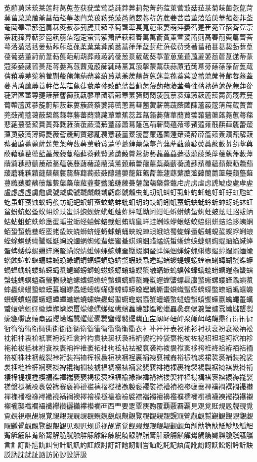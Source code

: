 莬莭莮莯莰莱莲莳莴莵莶获莸莹莺莻莼莽莾莿菀菁菂菃菄菅菆菇菈菉菊菋菌菍菎菏菐菑菒菓菔菕菖菗菘菙菚菛菜菝菞菟菠菡菢菣菤菥菦菧菨菩菪菫菬菭菮華菰菱菲菳菴菵菶菷菸菹菺菻菼菽菾菿萀萁萂萃萄萅萆萇萈萉萊萋萌萍萎萏萐萑萒萓萔萕萖萗萘萙萚萛萜萝萞萟萠萡萢萣萤营萦萧萨萩萪萫萬萭萮萯萰萱萲萳萴萵萶萷萸萹萺萻萼落萾萿葀葁葂葃葄葅葆葇葈葉葊葋葌葍葎葏葐葑葒葓葔葕葖著葘葙葚葛葜葝葞葟葠葡葢董葤葥葦葧葨葩葪葫葬葭葮葯葰葱葲葳葴葵葶葷葸葹葺葻葼葽葾葿蒀蒁蒂蒃蒄蒅蒆蒇蒈蒉蒊蒋蒌蒍蒎蒏蒐蒑蒒蒓蒔蒕蒖蒗蒘蒙蒚蒛蒜蒝蒞蒟蒠蒡蒢蒣蒤蒥蒦蒧蒨蒩蒪蒫蒬蒭蒮蒯蒰蒱蒲蒳蒴蒵蒶蒷蒸蒹蒺蒻蒼蒽蒾蒿蓀蓁蓂蓃蓄蓅蓆蓇蓈蓉蓊蓋蓌蓍蓎蓏蓐蓑蓒蓓蓔蓕蓖蓗蓘蓙蓚蓛蓜蓝蓞蓟蓠蓡蓢蓣蓤蓥蓦蓧蓨蓩蓪蓫蓬蓭蓮蓯蓰蓱蓲蓳蓴蓵蓶蓷蓸蓹蓺蓻蓼蓽蓾蓿蔀蔁蔂蔃蔄蔅蔆蔇蔈蔉蔊蔋蔌蔍蔎蔏蔐蔑蔒蔓蔔蔕蔖蔗蔘蔙蔚蔛蔜蔝蔞蔟蔠蔡蔢蔣蔤蔥蔦蔧蔨蔩蔪蔫蔬蔭蔮蔯蔰蔱蔲蔳蔴蔵蔶蔷蔸蔹蔺蔻蔼蔽蔾蔿蕀蕁蕂蕃蕄蕅蕆蕇蕈蕉蕊蕋蕌蕍蕎蕏蕐蕑蕒蕓蕔蕕蕖蕗蕘蕙蕚蕛蕜蕝蕞蕟蕠蕡蕢蕣蕤蕥蕦蕧蕨蕩蕪蕫蕬蕭蕮蕯蕰蕱蕲蕳蕴蕵蕶蕷蕸蕹蕺蕻蕼蕽蕾蕿薀薁薂薃薄薅薆薇薈薉薊薋薌薍薎薏薐薑薒薓薔薕薖薗薘薙薚薛薜薝薞薟薠薡薢薣薤薥薦薧薨薩薪薫薬薭薮薯薰薱薲薳薴薵薶薷薸薹薺薻薼薽薾薿藀藁藂藃藄藅藆藇藈藉藊藋藌藍藎藏藐藑藒藓藔藕藖藗藘藙藚藛藜藝藞藟藠藡藢藣藤藥藦藧藨藩藪藫藬藭藮藯藰藱藲藳藴藵藶藷藸藹藺藻藼藽藾藿蘀蘁蘂蘃蘄蘅蘆蘇蘈蘉蘊蘋蘌蘍蘎蘏蘐蘑蘒蘓蘔蘕蘖蘗蘘蘙蘚蘛蘜蘝蘞蘟蘠蘡蘢蘣蘤蘥蘦蘧蘨蘩蘪蘫蘬蘭蘮蘯蘰蘱蘲蘳蘴蘵蘶蘷蘸蘹蘺蘻蘼蘽蘾蘿虀虁虂虃虄虅虆虇虈虉虊虋虌虍虎虏虐虑虒虓虔處虖虗虘虙虚虛虜虝虞號虠虡虢虣虤虥虦虧虨虩虪虫虬虭虮虯虰虱虲虳虴虵虶虷虸虹虺虻虼虽虾虿蚀蚁蚂蚃蚄蚅蚆蚇蚈蚉蚊蚋蚌蚍蚎蚏蚐蚑蚒蚓蚔蚕蚖蚗蚘蚙蚚蚛蚜蚝蚞蚟蚠蚡蚢蚣蚤蚥蚦蚧蚨蚩蚪蚫蚬蚭蚮蚯蚰蚱蚲蚳蚴蚵蚶蚷蚸蚹蚺蚻蚼蚽蚾蚿蛀蛁蛂蛃蛄蛅蛆蛇蛈蛉蛊蛋蛌蛍蛎蛏蛐蛑蛒蛓蛔蛕蛖蛗蛘蛙蛚蛛蛜蛝蛞蛟蛠蛡蛢蛣蛤蛥蛦蛧蛨蛩蛪蛫蛬蛭蛮蛯蛰蛱蛲蛳蛴蛵蛶蛷蛸蛹蛺蛻蛼蛽蛾蛿蜀蜁蜂蜃蜄蜅蜆蜇蜈蜉蜊蜋蜌蜍蜎蜏蜐蜑蜒蜓蜔蜕蜖蜗蜘蜙蜚蜛蜜蜝蜞蜟蜠蜡蜢蜣蜤蜥蜦蜧蜨蜩蜪蜫蜬蜭蜮蜯蜰蜱蜲蜳蜴蜵蜶蜷蜸蜹蜺蜻蜼蜽蜾蜿蝀蝁蝂蝃蝄蝅蝆蝇蝈蝉蝊蝋蝌蝍蝎蝏蝐蝑蝒蝓蝔蝕蝖蝗蝘蝙蝚蝛蝜蝝蝞蝟蝠蝡蝢蝣蝤蝥蝦蝧蝨蝩蝪蝫蝬蝭蝮蝯蝰蝱蝲蝳蝴蝵蝶蝷蝸蝹蝺蝻蝼蝽蝾蝿螀螁螂螃螄螅螆螇螈螉螊螋螌融螎螏螐螑螒螓螔螕螖螗螘螙螚螛螜螝螞螟螠螡螢螣螤螥螦螧螨螩螪螫螬螭螮螯螰螱螲螳螴螵螶螷螸螹螺螻螼螽螾螿蟀蟁蟂蟃蟄蟅蟆蟇蟈蟉蟊蟋蟌蟍蟎蟏蟐蟑蟒蟓蟔蟕蟖蟗蟘蟙蟚蟛蟜蟝蟞蟟蟠蟡蟢蟣蟤蟥蟦蟧蟨蟩蟪蟫蟬蟭蟮蟯蟰蟱蟲蟳蟴蟵蟶蟷蟸蟹蟺蟻蟼蟽蟾蟿蠀蠁蠂蠃蠄蠅蠆蠇蠈蠉蠊蠋蠌蠍蠎蠏蠐蠑蠒蠓蠔蠕蠖蠗蠘蠙蠚蠛蠜蠝蠞蠟蠠蠡蠢蠣蠤蠥蠦蠧蠨蠩蠪蠫蠬蠭蠮蠯蠰蠱蠲蠳蠴蠵蠶蠷蠸蠹蠺蠻蠼蠽蠾蠿血衁衂衃衄衅衆衇衈衉衊衋行衍衎衏衐衑衒術衔衕衖街衘衙衚衛衜衝衞衟衠衡衢衣衤补衦衧表衩衪衫衬衭衮衯衰衱衲衳衴衵衶衷衸衹衺衻衼衽衾衿袀袁袂袃袄袅袆袇袈袉袊袋袌袍袎袏袐袑袒袓袔袕袖袗袘袙袚袛袜袝袞袟袠袡袢袣袤袥袦袧袨袩袪被袬袭袮袯袰袱袲袳袴袵袶袷袸袹袺袻袼袽袾袿裀裁裂裃裄装裆裇裈裉裊裋裌裍裎裏裐裑裒裓裔裕裖裗裘裙裚裛補裝裞裟裠裡裢裣裤裥裦裧裨裩裪裫裬裭裮裯裰裱裲裳裴裵裶裷裸裹裺裻裼製裾裿褀褁褂褃褄褅褆複褈褉褊褋褌褍褎褏褐褑褒褓褔褕褖褗褘褙褚褛褜褝褞褟褠褡褢褣褤褥褦褧褨褩褪褫褬褭褮褯褰褱褲褳褴褵褶褷褸褹褺褻褼褽褾褿襀襁襂襃襄襅襆襇襈襉襊襋襌襍襎襏襐襑襒襓襔襕襖襗襘襙襚襛襜襝襞襟襠襡襢襣襤襥襦襧襨襩襪襫襬襭襮襯襰襱襲襳襴襵襶襷襸襹襺襻襼襽襾西覀要覂覃覄覅覆覇覈覉覊見覌覍覎規覐覑覒覓覔覕視覗覘覙覚覛覜覝覞覟覠覡覢覣覤覥覦覧覨覩親覫覬覭覮覯覰覱覲観覴覵覶覷覸覹覺覻覼覽覾覿觀见观觃规觅视觇览觉觊觋觌觍觎觏觐觑角觓觔觕觖觗觘觙觚觛觜觝觞觟觠觡觢解觤觥触觧觨觩觪觫觬觭觮觯觰觱觲觳觴觵觶觷觸觹觺觻觼觽觾觿言訁訂訃訄訅訆訇計訉訊訋訌訍討訏訐訑訒訓訔訕訖託記訙訚訛訜訝訞訟訠訡訢訣訤訥訦訧訨訩訪訫訬設訮訯